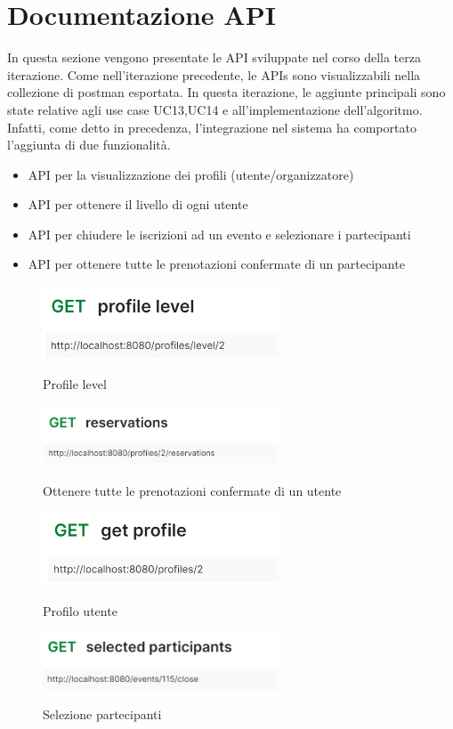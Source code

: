 \section{Documentazione API}

In questa sezione vengono presentate le API sviluppate nel corso della terza iterazione. Come nell'iterazione precedente,
le APIs sono visualizzabili nella collezione di postman esportata. In questa iterazione, le aggiunte principali sono state relative agli use case
UC13,UC14 e all'implementazione dell'algoritmo. Infatti, come detto in precedenza, l'integrazione nel sistema ha comportato l'aggiunta di 
due funzionalità.

\begin{itemize}
    \item API per la visualizzazione dei profili (utente/organizzatore)
    \item API per ottenere il livello di ogni utente
    \item API per chiudere le iscrizioni ad un evento e selezionare i partecipanti
    \item API per ottenere tutte le prenotazioni confermate di un partecipante
\end{itemize}
\begin{figure}[h!]
    \includegraphics[width=7cm]{Iterazione 3/images/level.png}\\
    \caption{Profile level}
\end{figure}
\begin{figure}[h!]
    \includegraphics[width=7cm]{Iterazione 3/images/reservations.png}\\
    \caption{Ottenere tutte le prenotazioni confermate di un utente}
\end{figure}
\begin{figure}[h!]
    \includegraphics[width=7cm]{Iterazione 3/images/profile.png}\\
    \caption{Profilo utente}
\end{figure}
\begin{figure}[h!]
    \includegraphics[width=7cm]{Iterazione 3/images/selected participants.png}\\
    \caption{Selezione partecipanti}
\end{figure}

